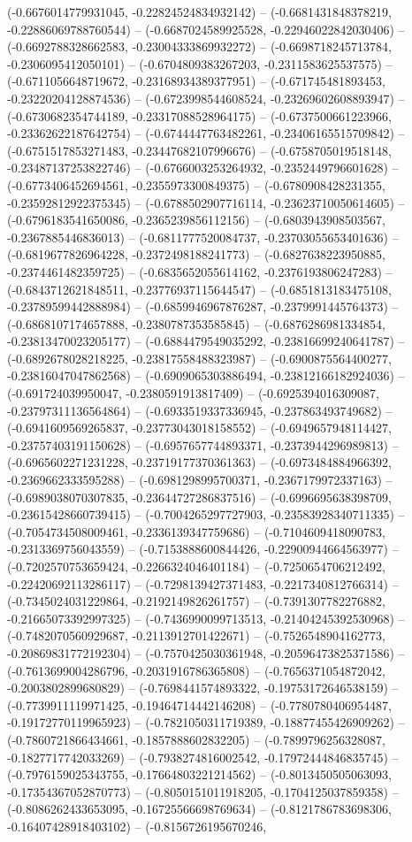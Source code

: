 (-0.6676014779931045, -0.22824524834932142) -- (-0.6681431848378219, -0.22886069788760544) -- (-0.6687024589925528, -0.22946022842030406) -- (-0.6692788328662583, -0.23004333869932272) -- (-0.6698718245713784, -0.2306095412050101) -- (-0.6704809383267203, -0.2311583625537575) -- (-0.6711056648719672, -0.23168934389377951) -- (-0.671745481893453, -0.23220204128874536) -- (-0.6723998544608524, -0.23269602608893947) -- (-0.6730682354744189, -0.23317088528964175) -- (-0.6737500661223966, -0.23362622187642754) -- (-0.6744447763482261, -0.23406165515709842) -- (-0.6751517853271483, -0.23447682107996676) -- (-0.6758705019518148, -0.23487137253822746) -- (-0.6766003253264932, -0.2352449796601628) -- (-0.6773406452694561, -0.2355973300849375) -- (-0.6780908428231355, -0.23592812922375345) -- (-0.6788502907716114, -0.23623710050614605) -- (-0.6796183541650086, -0.2365239856112156) -- (-0.6803943908503567, -0.2367885446836013) -- (-0.6811777520084737, -0.23703055653401636) -- (-0.6819677826964228, -0.2372498188241773) -- (-0.6827638223950885, -0.2374461482359725) -- (-0.6835652055614162, -0.2376193806247283) -- (-0.6843712621848511, -0.23776937115644547) -- (-0.6851813183475108, -0.23789599442888984) -- (-0.6859946967876287, -0.2379991445764373) -- (-0.6868107174657888, -0.2380787353585845) -- (-0.6876286981334854, -0.23813470023205177) -- (-0.6884479549035292, -0.23816699240641787) -- (-0.6892678028218225, -0.23817558488323987) -- (-0.6900875564400277, -0.23816047047862568) -- (-0.6909065303886494, -0.23812166182924036) -- (-0.691724039950047, -0.2380591913817409) -- (-0.6925394016309087, -0.23797311136564864) -- (-0.6933519337336945, -0.237863493749682) -- (-0.6941609569265837, -0.23773043018158552) -- (-0.6949657948114427, -0.23757403191150628) -- (-0.6957657744893371, -0.2373944296989813) -- (-0.6965602271231228, -0.23719177370361363) -- (-0.6973484884966392, -0.2369662333595288) -- (-0.6981298995700371, -0.2367179972337163) -- (-0.6989038070307835, -0.23644727286837516) -- (-0.6996695638398709, -0.23615428660739415) -- (-0.7004265297727903, -0.23583928340711335) -- (-0.7054734508009461, -0.2336139347759686) -- (-0.7104609418090783, -0.2313369756043559) -- (-0.7153888600844426, -0.22900944664563977) -- (-0.7202570753659424, -0.2266324046401184) -- (-0.7250654706212492, -0.22420692113286117) -- (-0.7298139427371483, -0.2217340812766314) -- (-0.7345024031229864, -0.2192149826261757) -- (-0.7391307782276882, -0.21665073392997325) -- (-0.7436990099713513, -0.21404245392530968) -- (-0.7482070560929687, -0.2113912701422671) -- (-0.7526548904162773, -0.20869831772192304) -- (-0.7570425030361948, -0.20596473825371586) -- (-0.7613699004286796, -0.2031916786365808) -- (-0.7656371054872042, -0.2003802899680829) -- (-0.7698441574893322, -0.19753172646538159) -- (-0.7739911119971425, -0.19464714442146208) -- (-0.7780780406954487, -0.19172770119965923) -- (-0.7821050311719389, -0.18877455426909262) -- (-0.7860721866434661, -0.1857888602832205) -- (-0.7899796256328087, -0.1827717742033269) -- (-0.7938274816002542, -0.17972444846835745) -- (-0.7976159025343755, -0.17664803221214562) -- (-0.8013450505063093, -0.17354367052870773) -- (-0.8050151011918205, -0.1704125037859358) -- (-0.8086262433653095, -0.16725566698769634) -- (-0.8121786783698306, -0.16407428918403102) -- (-0.8156726195670246, 